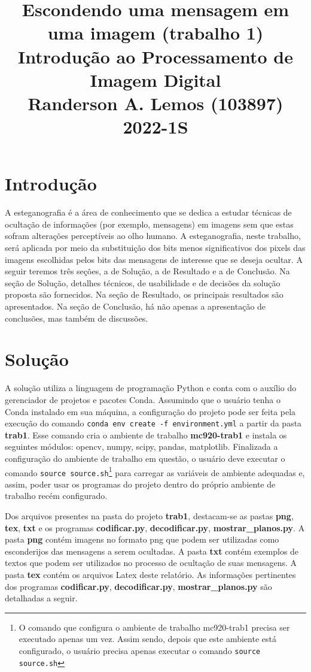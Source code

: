 \documentclass{article}
\title{
	Escondendo uma mensagem em uma imagem (trabalho 1) \\
	\Large Introdução ao Processamento de Imagem Digital \\
	Randerson A. Lemos (103897)
	2022-1S
}
\date{\vspace{-5ex}}
\begin{document}
  \maketitle

%
\section{Introdução}
A esteganografia é a área de conhecimento que se dedica a estudar técnicas de ocultação de informações (por exemplo, mensagens) em imagens sem que estas sofram alterações perceptíveis ao olho humano. A esteganografia, neste trabalho, será aplicada por meio da substituição dos bits menos significativos dos pixels das imagens escolhidas pelos bits das mensagens de interesse que se deseja ocultar. A seguir teremos três seções, a de Solução, a de Resultado e a de Conclusão. Na seção de Solução, detalhes técnicos, de usabilidade e de decisões da solução proposta são fornecidos. Na seção de Resultado, os principais resultados são apresentados. Na seção de Conclusão, há não apenas a apresentação de conclusões, mas também de discussões.

%
\section{Solução}
A solução utiliza a linguagem de programação Python e conta com o auxílio do gerenciador de projetos e pacotes Conda. Assumindo que o usuário tenha o Conda instalado em sua máquina, a configuração do projeto pode ser feita pela execução do comando \lstinline{conda env create -f environment.yml} a partir da pasta \textbf{trab1}. Esse comando cria o ambiente de trabalho \textbf{mc920-trab1} e instala os seguintes módulos: opencv, numpy, scipy, pandas, matplotlib. Finalizada a configuração do ambiente de trabalho em questão, o usuário deve executar o comando \lstinline{source source.sh}\footnote{O comando que configura o ambiente de trabalho mc920-trab1 precisa ser executado apenas um vez. Assim sendo, depois que este ambiente está configurado, o usuário precisa apenas executar o comando \lstinline{source source.sh}} para carregar as variáveis de ambiente adequadas e, assim, poder usar os programas do projeto dentro do próprio ambiente de trabalho recém configurado. 

Dos arquivos presentes na pasta do projeto \textbf{trab1}, destacam-se as pastas \textbf{png}, \textbf{tex}, \textbf{txt} e os programas \textbf{codificar.py}, \textbf{decodificar.py}, \textbf{mostrar\_planos.py}. A pasta \textbf{png} contém imagens no formato png que podem ser utilizadas como esconderijos das mensagens a serem ocultadas. A pasta \textbf{txt} contém exemplos de textos que podem ser utilizados no processo de ocultação de suas mensagens. A pasta \textbf{tex} contém os arquivos Latex deste relatório. As informações pertinentes dos programas \textbf{codificar.py}, \textbf{decodificar.py}, \textbf{mostrar\_planos.py} são detalhadas a seguir.
\end{document}
